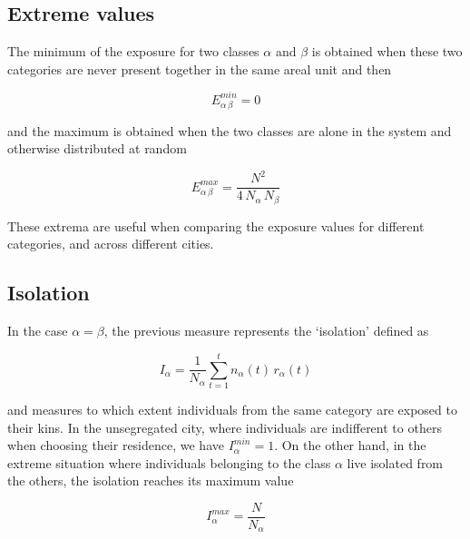 \subsection{Extreme values}
\label{sub:extreme_values}

The minimum of the exposure for two classes $\alpha$ and $\beta$ is obtained
when these two categories are never present together in the same areal unit and
then

\begin{equation}
    E_{\alpha\,\beta}^{min} = 0 
\end{equation}

and the maximum is obtained when the two classes are alone in the system and
otherwise distributed at random

\begin{equation}
    E_{\alpha\,\beta}^{max} = \frac{N^2}{4\,N_\alpha\, N_\beta}
\end{equation}

These extrema are useful when comparing the exposure values for different
categories, and across different cities.



\subsection{Isolation}
\label{sub:isolation}

In the case $\alpha = \beta$, the previous measure represents the
`isolation' defined as

\begin{equation}
    I_\alpha = \frac{1}{N_\alpha}\sum_{t=1}^{t} n_\alpha(t)\,r_\alpha(t)
\end{equation}

and measures to which extent individuals from the same category are
exposed to their kins. In the unsegregated city, where individuals are
indifferent to others when choosing their residence, we have
$I_\alpha^{min}=1$. On the other hand, in the extreme situation where
individuals belonging to the class $\alpha$ live isolated from the
others, the isolation reaches its maximum value

\begin{equation}
    I_\alpha^{max} = \frac{N}{N_\alpha}
\end{equation}



